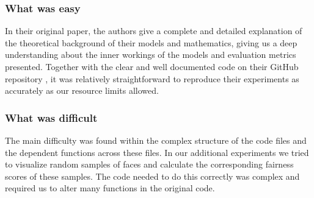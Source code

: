 \subsubsection{What was easy} 

In their original paper, the authors give a complete and detailed explanation of the theoretical background of their models and mathematics, giving us a deep understanding about the inner workings of the models and evaluation metrics presented. Together with the clear and well documented code on their GitHub repository \cite{peychev2022latent}, it was relatively straightforward to reproduce their experiments as accurately as our resource limits allowed.



\subsubsection{What was difficult}


The main difficulty was found within the complex structure of the code files and the dependent functions across these files. In our additional experiments we tried to visualize random samples of faces and calculate the corresponding fairness scores of these samples. The code needed to do this correctly was complex and required us to alter many functions in the original code.

